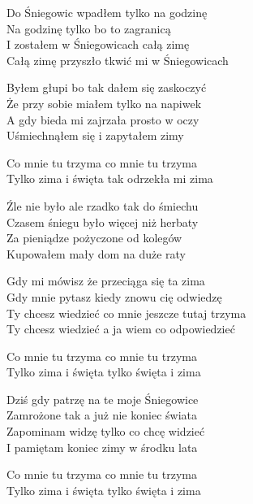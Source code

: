 \begin{text}
    Do Śniegowic wpadłem tylko na godzinę\\
    Na godzinę tylko bo to zagranicą\\
    I zostałem w Śniegowicach całą zimę\\
    Całą zimę przyszło tkwić mi w Śniegowicach

    Byłem głupi bo tak dałem się zaskoczyć\\
    Że przy sobie miałem tylko na napiwek\\
    A gdy bieda mi zajrzała prosto w oczy\\
    Uśmiechnąłem się i zapytałem zimy

    \vin Co mnie tu trzyma co mnie tu trzyma\\
    \vin Tylko zima i święta tak odrzekła mi zima

    Źle nie było ale rzadko tak do śmiechu\\
    Czasem śniegu było więcej niż herbaty\\
    Za pieniądze pożyczone od kolegów\\
    Kupowałem mały dom na duże raty

    Gdy mi mówisz że przeciąga się ta zima\\
    Gdy mnie pytasz kiedy znowu cię odwiedzę\\
    Ty chcesz wiedzieć co mnie jeszcze tutaj trzyma\\
    Ty chcesz wiedzieć a ja wiem co odpowiedzieć

    \vin Co mnie tu trzyma co mnie tu trzyma\\
    \vin Tylko zima i święta tylko święta i zima

    Dziś gdy patrzę na te moje Śniegowice\\
    Zamrożone tak a już nie koniec świata\\
    Zapominam widzę tylko co chcę widzieć\\
    I pamiętam koniec zimy w środku lata

    \vin Co mnie tu trzyma co mnie tu trzyma\\
    \vin Tylko zima i święta tylko święta i zima
\end{text}
